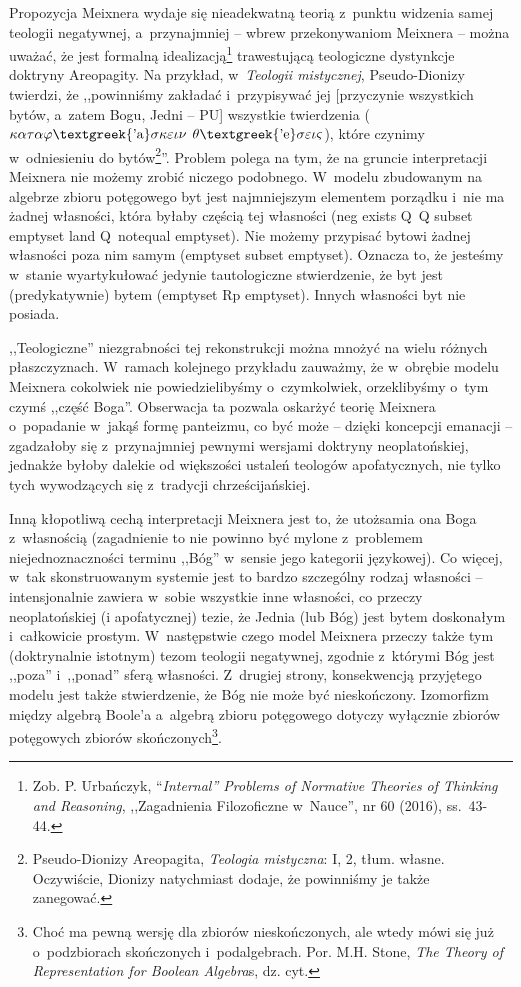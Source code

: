 Propozycja Meixnera wydaje się nieadekwatną teorią z~punktu widzenia samej teologii negatywnej, a~przynajmniej -- wbrew przekonywaniom Meixnera -- można uważać, że jest formalną idealizacją\footnote{Zob. P. Urbańczyk, ``\textit{Internal'' Problems of Normative Theories of Thinking and Reasoning}, ,,Zagadnienia Filozoficzne w~Nauce'', nr 60 (2016), ss.~43-44.} trawestującą teologiczne dystynkcje doktryny Areopagity. Na przykład, w~\textit{Teologii mistycznej}, Pseudo-Dionizy twierdzi, że ,,powinniśmy zakładać i~przypisywać jej [przyczynie wszystkich bytów, a~zatem Bogu, Jedni -- PU] wszystkie twierdzenia ($\kappa \alpha \tau \alpha \varphi \text{\textgreek{'a}}\sigma \kappa \varepsilon \iota \nu $ $\theta \text{\textgreek{'e}}\sigma \varepsilon \iota \varsigma $), które czynimy w~odniesieniu do bytów\footnote{Pseudo-Dionizy Areopagita, \textit{Teologia mistyczna}: I, 2, tłum. własne. Oczywiście, Dionizy natychmiast dodaje, że powinniśmy je także zanegować.}''. Problem polega na tym, że na gruncie interpretacji Meixnera nie możemy zrobić niczego podobnego. W~modelu zbudowanym na algebrze zbioru potęgowego byt jest najmniejszym elementem porządku i~nie ma żadnej własności, która byłaby częścią tej własności (neg exists Q~Q subset emptyset land Q~notequal emptyset). Nie możemy przypisać bytowi żadnej własności poza nim samym (emptyset subset emptyset). Oznacza to, że jesteśmy w~stanie wyartykułować jedynie tautologiczne stwierdzenie, że byt jest (predykatywnie) bytem (emptyset Rp emptyset). Innych własności byt nie posiada.

,,Teologiczne'' niezgrabności tej rekonstrukcji można mnożyć na wielu różnych płaszczyznach. W~ramach kolejnego przykładu zauważmy, że w~obrębie modelu Meixnera cokolwiek nie powiedzielibyśmy o~czymkolwiek, orzeklibyśmy o~tym czymś ,,część Boga''. Obserwacja ta pozwala oskarżyć teorię Meixnera o~popadanie w~jakąś formę panteizmu, co być może -- dzięki koncepcji emanacji -- zgadzałoby się z~przynajmniej pewnymi wersjami doktryny neoplatońskiej, jednakże byłoby dalekie od większości ustaleń teologów apofatycznych, nie tylko tych wywodzących się z~tradycji chrześcijańskiej.

Inną kłopotliwą cechą interpretacji Meixnera jest to, że utożsamia ona Boga z~własnością (zagadnienie to nie powinno być mylone z~problemem niejednoznaczności terminu ,,Bóg'' w~sensie jego kategorii językowej). Co więcej, w~tak skonstruowanym systemie jest to bardzo szczególny rodzaj własności -- intensjonalnie zawiera w~sobie wszystkie inne własności, co przeczy neoplatońskiej (i apofatycznej) tezie, że Jednia (lub Bóg) jest bytem doskonałym i~całkowicie prostym. W~następstwie czego model Meixnera przeczy także tym (doktrynalnie istotnym) tezom teologii negatywnej, zgodnie z~którymi Bóg jest ,,poza'' i~,,ponad'' sferą własności. Z~drugiej strony, konsekwencją przyjętego modelu jest także stwierdzenie, że Bóg nie może być nieskończony. Izomorfizm między algebrą Boole'a a~algebrą zbioru potęgowego dotyczy wyłącznie zbiorów potęgowych zbiorów skończonych\footnote{Choć ma pewną wersję dla zbiorów nieskończonych, ale wtedy mówi się już o~podzbiorach skończonych i~podalgebrach. Por. M.H. Stone, \textit{The Theory of Representation for Boolean Algebra}s, dz. cyt.}.

